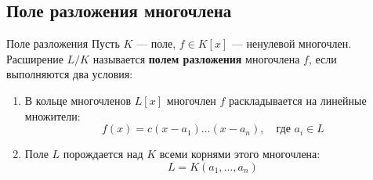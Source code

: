 \subsection{Поле разложения многочлена}

\begin{Definition}{Поле разложения}{}
	Пусть $K$ --- поле, $f \in K[x]$ --- ненулевой многочлен.
	Расширение $L/K$ называется \textbf{полем разложения} многочлена $f$, если выполняются два условия:
	\begin{enumerate}
		\item В кольце многочленов $L[x]$ многочлен $f$ раскладывается на линейные множители:
		\[ f(x) = c(x-a_1)\dots(x-a_n), \quad \text{где } a_i \in L \]
		\item Поле $L$ порождается над $K$ всеми корнями этого многочлена:
		\[ L = K(a_1, \dots, a_n) \]
	\end{enumerate}
\end{Definition}